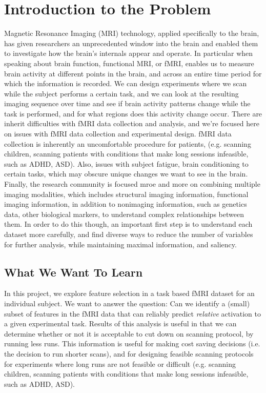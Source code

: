 \documentclass{report}
\begin{document}



\section{Introduction to the Problem}
Magnetic Resonance Imaging (MRI) technology, applied specifically to the brain, has given researchers an unprecedented window into the brain and enabled them to investigate how the brain's internals appear and operate. In particular when speaking about brain function, functional MRI, or fMRI, enables us to measure brain activity at different points in the brain, and across an entire time period for which the information is recorded. We can design experiments where we scan while the subject performs a certain task, and we can look at the resulting imaging sequence over time and see if brain activity patterns change while the task is performed, and for what regions does this activity change occur. 
There are inherit difficulties with fMRI data collection and analysis, and we're focused here on issues with fMRI data collection and experimental design. fMRI data collection is inherently an uncomfortable procedure for patients, (e.g. scanning children, scanning patients with conditions that make long sessions infeasible, such as ADHD, ASD). Also, issues with subject fatigue, brain conditioning to certain tasks, which may obscure unique changes we want to see in the brain. Finally, the research community is focused mroe and more on combining multiple imaging modalities, which includes structural imaging information, functional imaging information, in addition to nonimaging information, such as genetics data, other biological markers, to understand complex relationships between them. In order to do this though, an important first step is to understand each dataset more carefully, and find diverse ways to reduce the number of variables for further analysis, while maintaining maximal information, and saliency.
\subsection{What We Want To Learn}
In this project, we explore feature selection in a task based fMRI dataset for an individual subject. We want to answer the question: Can we identify a (small) subset of features in the fMRI data that can reliably predict \textit{relative} activation to a given experimental task. Results of this analysis is useful in that we can determine whether or not it is acceptable to cut down on scanning protocol, by running less runs. This information is useful for making cost saving decisions (i.e. the decision to run shorter scans), and for designing feasible scanning protocols for experiments where long runs are not feasible or difficult  (e.g. scanning children, scanning patients with conditions that make long sessions infeasible, such as ADHD, ASD).  
\end{document}
